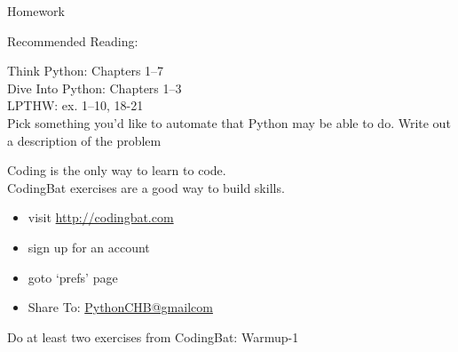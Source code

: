 \documentclass{beamer}
\begin{document}
\begin{frame}[fragile]{Homework}

Recommended Reading:

\hspace{0.2in} Think Python: Chapters 1--7 \\

\hspace{0.2in} Dive Into Python: Chapters 1--3 \\

\hspace{0.2in} LPTHW: ex. 1--10, 18-21 \\

\vfill
Pick something you'd like to automate that Python may be able to do.
Write out a description of the problem


\vfill
Coding is the only way to learn to code.\\
CodingBat exercises are a good way to build skills.
\begin{itemize}
  \item visit \url{http://codingbat.com}
  \item sign up for an account
  \item goto ‘prefs’ page
  \item Share To: \url{PythonCHB@gmailcom}
\end{itemize}

Do at least two exercises from CodingBat: Warmup-1 

\end{frame}
\end{document}
